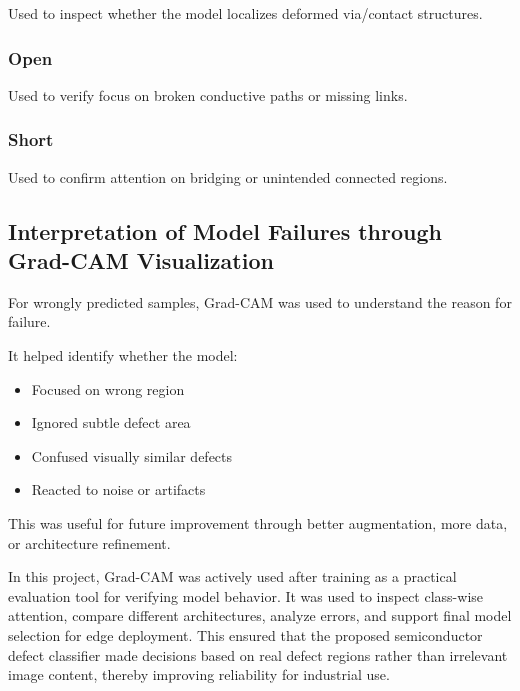 Used to inspect whether the model localizes deformed via/contact structures.

\subsubsection{Open}

Used to verify focus on broken conductive paths or missing links.

\subsubsection{Short}

Used to confirm attention on bridging or unintended connected regions.

\subsection{Interpretation of Model Failures through Grad-CAM Visualization}

For wrongly predicted samples, Grad-CAM was used to understand the reason for failure.

It helped identify whether the model:
\begin{itemize}
\item Focused on wrong region
\item Ignored subtle defect area
\item Confused visually similar defects
\item Reacted to noise or artifacts
\end{itemize}
This was useful for future improvement through better augmentation, more data, or architecture refinement.

In this project, Grad-CAM was actively used after training as a practical evaluation tool for verifying model behavior. It was used to inspect class-wise attention, compare different architectures, analyze errors, and support final model selection for edge deployment. This ensured that the proposed semiconductor defect classifier made decisions based on real defect regions rather than irrelevant image content, thereby improving reliability for industrial use.